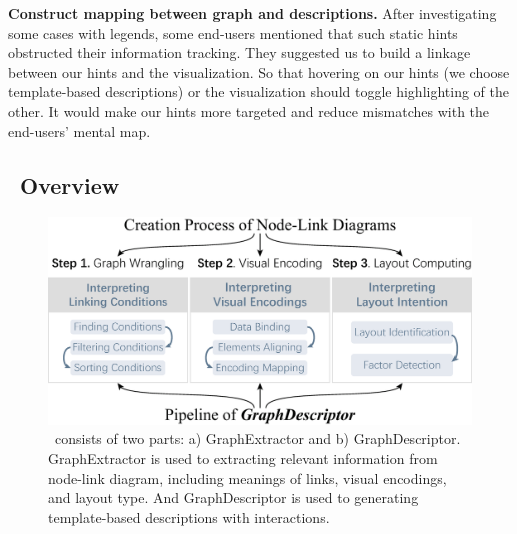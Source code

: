 \begin{compactenum}[\textbf{D}1]
    \item {\bf Construct mapping between graph and descriptions.} 
    After investigating some cases with legends, some end-users mentioned that such static hints obstructed their information tracking. They suggested us to build a linkage between our hints and the visualization. So that hovering on our hints (we choose template-based descriptions) or the visualization should toggle highlighting of the other.
    It would make our hints more targeted and reduce mismatches with the end-users' mental map.
\end{compactenum}

\subsection{\ApproachName~Overview} \label{sec:overview}

\begin{figure}[t]
    \centering
    \includegraphics[width=2\columnwidth]{figures/workflow.eps}
    \caption{\ApproachName~consists of two parts: a) GraphExtractor and b) GraphDescriptor. GraphExtractor is used to extracting relevant information from node-link diagram, including meanings of links, visual encodings, and layout type. And GraphDescriptor is used to generating template-based descriptions with interactions. 
    }
    \label{fig:workflow}
\end{figure}

